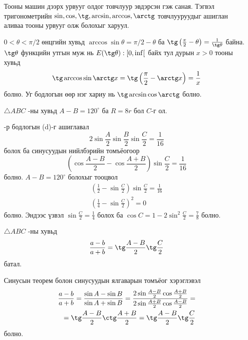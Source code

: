 \documentclass[10pt,a4paper,oneside]{book}
\begin{document}
\Note

\Problem
Тооны машин дээрх урвууг олдог товчлуур эвдэрсэн гэж саная. Тэгвэл тригонометрийн $\sin, \cos, \tg, \arcsin, \arccos, \arctg$ товчлууруудыг ашиглан аливаа тооны урвууг олж болохыг харуул.

\TheSolution
$0<\theta < \pi/2$ өнцгийн хувьд $\arccos\sin \theta = \pi/2 - \theta$ ба $\tg\left(\frac{\pi}{2} - \theta\right) = \frac{1}{\tg\theta}$ байна. $\tg\theta$ функцийн утгын муж нь $E(\tg\theta): [0, \inf[$ байх тул дурын $x > 0$ тооны хувьд
\begin{equation*}
\tg\arccos\sin\arctg x = \tg \left(\frac{\pi}{2} - \arctg x \right) = \frac{1}{x}
\end{equation*}
болно. Уг бодлогын өөр нэг хариу нь $\tg\arcsin\cos\arctg$ болно.

\Problem
$\triangle ABC$ -ны хувьд $A-B=120^\circ$ ба $R=8r$ бол $C$-г ол.

-р бодлогын (d)-г ашиглавал
\begin{equation*}
2\sin\frac{A}{2}\sin\frac{B}{2}\sin\frac{C}{2} = \frac{1}{16}
\end{equation*}
болох ба синусуудын нийлбэрийн томъёогоор
\begin{equation*}
\left(\cos\frac{A-B}{2} - \cos\frac{A+B}{2}\right)\sin\frac{C}{2} = \frac{1}{16}
\end{equation*}
болно. $A-B=120^\circ$ болохыг тооцвол
\begin{align*}
\left(\frac{1}{2} - \sin\frac{C}{2}\right)\sin\frac{C}{2} = \frac{1}{16} \\
\left(\frac{1}{4} - \sin\frac{C}{2}\right)^2 = 0
\end{align*}
болно. Эндээс үзвэл $\sin\frac{C}{2} = \frac{1}{4}$ болох ба $\cos C = 1-2\sin^2 \frac{C}{2} = \frac{7}{8}$ болно.

\Problem
$\triangle ABC$ -ны хувьд
\begin{equation*}
\frac{a-b}{a+b} = \tg\frac{A-B}{2}\tg\frac{C}{2}
\end{equation*}
батал.

\TheSolution
Синусын теорем болон синусуудын ялгаварын томъёог хэрэглэвэл
\begin{align*}
\frac{a-b}{a+b} = \frac{\sin A - \sin B}{\sin A + \sin B} = \frac{2\sin\frac{A-B}{2}\cos\frac{A+B}{2}}{2\sin\frac{A+B}{2}\cos\frac{A-B}{2}} = \\
= \tg\frac{A-B}{2}\ctg\frac{A+B}{2} = \tg\frac{A-B}{2}\tg\frac{C}{2}
\end{align*}
болно.
\end{document}
